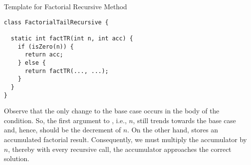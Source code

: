 \begin{cl}[]{Template for Factorial Recursive Method}
\begin{lstlisting}[language=MyJava]
class FactorialTailRecursive {

  static int factTR(int n, int acc) {
    if (isZero(n)) {
      return acc;
    } else {
      return factTR(..., ...);
    }
  }
}
\end{lstlisting}
\end{cl}

Observe that the only change to the base case occurs in the body of the condition. So, the first argument to , i.e., $n$, still trends towards the base case and, hence, should be the decrement of $n$. On the other hand,  stores an accumulated factorial result. Consequently, we must multiply the accumulator by $n$, thereby with every recursive call, the accumulator approaches the correct solution.

